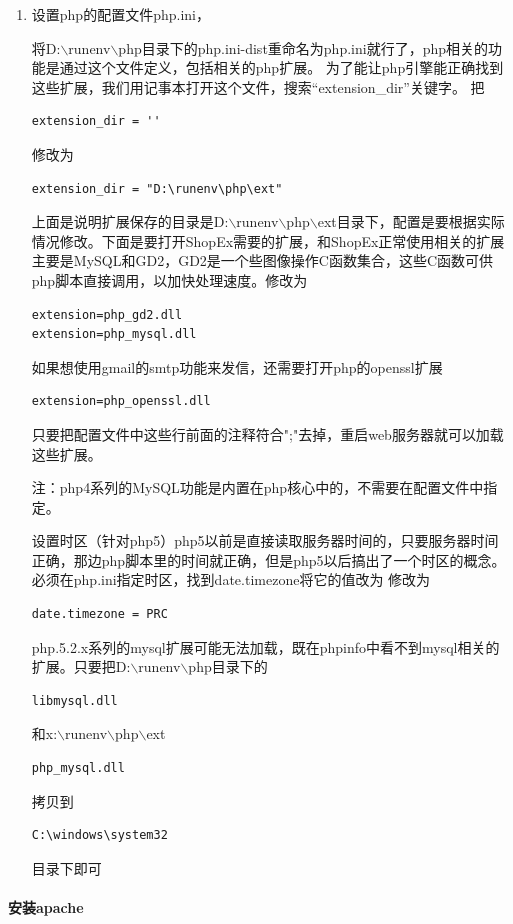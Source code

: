 \documentclass{article}
\begin{document}
\begin{enumerate}
\item 设置php的配置文件php.ini，

将D:$\backslash$runenv$\backslash$php目录下的php.ini-dist重命名为php.ini就行了，php相关的功能是通过这个文件定义，包括相关的php扩展。
为了能让php引擎能正确找到这些扩展，我们用记事本打开这个文件，搜索“extension\_dir”关键字。 把
\begin{verbatim}
extension_dir = ''
\end{verbatim}
修改为
\begin{verbatim}
extension_dir = "D:\runenv\php\ext"
\end{verbatim}
上面是说明扩展保存的目录是D:$\backslash$runenv$\backslash$php$\backslash$ext目录下，配置是要根据实际情况修改。下面是要打开ShopEx需要的扩展，和ShopEx正常使用相关的扩展主要是MySQL和GD2，GD2是一个些图像操作C函数集合，这些C函数可供php脚本直接调用，以加快处理速度。修改为
\begin{verbatim}
extension=php_gd2.dll
extension=php_mysql.dll
\end{verbatim}
如果想使用gmail的smtp功能来发信，还需要打开php的openssl扩展
\begin{verbatim}
extension=php_openssl.dll
\end{verbatim}
只要把配置文件中这些行前面的注释符合";"去掉，重启web服务器就可以加载这些扩展。 

注：php4系列的MySQL功能是内置在php核心中的，不需要在配置文件中指定。

设置时区（针对php5）php5以前是直接读取服务器时间的，只要服务器时间正确，那边php脚本里的时间就正确，但是php5以后搞出了一个时区的概念。
必须在php.ini指定时区，找到date.timezone将它的值改为 修改为
\begin{verbatim}
date.timezone = PRC
\end{verbatim}
php.5.2.x系列的mysql扩展可能无法加载，既在phpinfo中看不到mysql相关的扩展。只要把D:$\backslash$runenv$\backslash$php目录下的
\begin{verbatim}
libmysql.dll
\end{verbatim}
和x:$\backslash$runenv$\backslash$php$\backslash$ext
\begin{verbatim}
php_mysql.dll
\end{verbatim}
拷贝到 
\begin{verbatim}
C:\windows\system32
\end{verbatim}
目录下即可
\end{enumerate}

\paragraph{}\textbf{安装apache}\\
\end{document}
